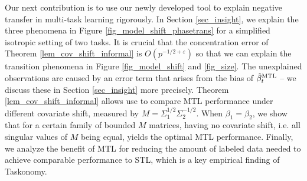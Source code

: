 Our next contribution is to use our newly developed tool to explain negative transfer in multi-task learning rigorously.
In Section \ref{sec_insight}, we explain the three phenomena in Figure \ref{fig_model_shift_phasetrans} for a simplified isotropic setting of two tasks.
It is crucial that the concentration error of Theorem \ref{lem_cov_shift_informal} is $O(p^{-1/2+\varepsilon})$ so that we can explain the transition phenomena in Figure \ref{fig_model_shift} and \ref{fig_size}.
The unexplained observations are caused by an error term that arises from the bias of $\hat{\beta}_t^{\text{MTL}}$ -- we discuss these in Section \ref{sec_insight} more precisely.
Theorem \ref{lem_cov_shift_informal} allows use to compare MTL performance under different covariate shift, measured by $M = \Sigma_1^{1/2}\Sigma_2^{-1/2}$.
When $\beta_1 = \beta_2$, we show that for a certain family of bounded $M$ matrices, having no covariate shift, i.e. all singular values of $M$ being equal, yields the optimal MTL performance.
Finally, we analyze the benefit of MTL for reducing the amount of labeled data needed to achieve comparable performance to STL, which is a key empirical finding of Taskonomy.


